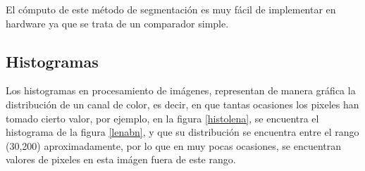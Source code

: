 \documentclass[twoside,spanish,ESP,MSc]{plantillaLabUPV}
\theoremstyle{definition}
\begin{document}
El cómputo de este método de segmentación es muy fácil de implementar en hardware ya que se trata de un comparador simple.


\subsection{Histogramas}
Los histogramas en procesamiento de imágenes, representan de manera gráfica la distribución de un canal de color, es decir, en que tantas ocasiones los pixeles han tomado cierto valor,  por ejemplo, en la figura \ref{histolena}, se encuentra el histograma de la figura \ref{lenabn}, y que su distribución se encuentra entre el rango (30,200) aproximadamente, por lo que en muy pocas ocasiones, se encuentran valores de pixeles en esta imágen fuera de este rango.
\end{document}
